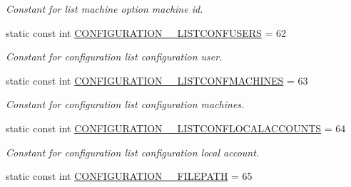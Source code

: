 \begin{DoxyCompactItemize}
\begin{DoxyCompactList}\small\item\em Constant for list machine option machine id. \item\end{DoxyCompactList}\item 
\hypertarget{classUMS__Data_1_1UMS__DataPackage_a77795687c70e456ad26df5e1fb988fa3}{
static const int \hyperlink{classUMS__Data_1_1UMS__DataPackage_a77795687c70e456ad26df5e1fb988fa3}{CONFIGURATION\_\-\_\-LISTCONFUSERS} = 62}
\label{classUMS__Data_1_1UMS__DataPackage_a77795687c70e456ad26df5e1fb988fa3}

\begin{DoxyCompactList}\small\item\em Constant for configuration list configuration user. \item\end{DoxyCompactList}\item 
\hypertarget{classUMS__Data_1_1UMS__DataPackage_ac8e35fe610fd6a5ddea75675761d17fb}{
static const int \hyperlink{classUMS__Data_1_1UMS__DataPackage_ac8e35fe610fd6a5ddea75675761d17fb}{CONFIGURATION\_\-\_\-LISTCONFMACHINES} = 63}
\label{classUMS__Data_1_1UMS__DataPackage_ac8e35fe610fd6a5ddea75675761d17fb}

\begin{DoxyCompactList}\small\item\em Constant for configuration list configuration machines. \item\end{DoxyCompactList}\item 
\hypertarget{classUMS__Data_1_1UMS__DataPackage_a2b9b5891a0c2bca529ba7c590fdcdb4f}{
static const int \hyperlink{classUMS__Data_1_1UMS__DataPackage_a2b9b5891a0c2bca529ba7c590fdcdb4f}{CONFIGURATION\_\-\_\-LISTCONFLOCALACCOUNTS} = 64}
\label{classUMS__Data_1_1UMS__DataPackage_a2b9b5891a0c2bca529ba7c590fdcdb4f}

\begin{DoxyCompactList}\small\item\em Constant for configuration list configuration local account. \item\end{DoxyCompactList}\item 
\hypertarget{classUMS__Data_1_1UMS__DataPackage_a11a26558a6ddebfaa0aae8301e531b5c}{
static const int \hyperlink{classUMS__Data_1_1UMS__DataPackage_a11a26558a6ddebfaa0aae8301e531b5c}{CONFIGURATION\_\-\_\-FILEPATH} = 65}
\label{classUMS__Data_1_1UMS__DataPackage_a11a26558a6ddebfaa0aae8301e531b5c}


\end{DoxyCompactItemize}
